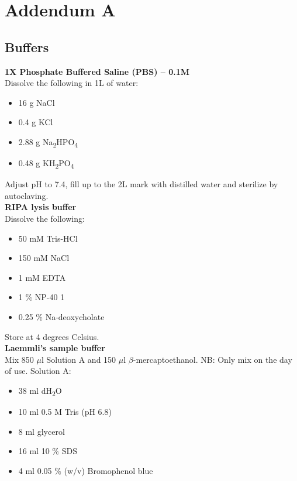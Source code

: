 \chapter*{Addendum A}\label{addendum}

\section*{Buffers}

\noindent
\textbf{1X Phosphate Buffered Saline (PBS) – 0.1M} \\
Dissolve the following in 1L of water:
\begin{itemize}
\item 16 g NaCl 
\item 0.4 g KCl 
\item 2.88 g Na\textsubscript{2}HPO\textsubscript{4} 
\item 0.48 g KH\textsubscript{2}PO\textsubscript{4} 
\end{itemize}
Adjust pH to 7.4, fill up to the 2L mark with distilled water and sterilize by autoclaving. \\

\noindent
\textbf{RIPA lysis buffer} \\
Dissolve the following:
\begin{itemize}
\item 50 mM Tris-HCl
\item 150 mM NaCl 
\item 1 mM EDTA 
\item 1 \% NP-40 1
\item 0.25 \% Na-deoxycholate 
\end{itemize}
Store at 4 degrees Celsius. \\

\noindent
\textbf{Laemmli’s sample buffer} \\
Mix 850 $\mu$l Solution A and 150 $\mu$l $\beta$-mercaptoethanol. NB: Only mix on the day of use. Solution A:
\begin{itemize}
\item 38 ml dH\textsubscript{2}O
\item 10 ml 0.5 M Tris (pH 6.8)
\item 8 ml glycerol
\item 16 ml 10 \% SDS
\item 4 ml 0.05 \% (w/v) Bromophenol blue
\end{itemize}

